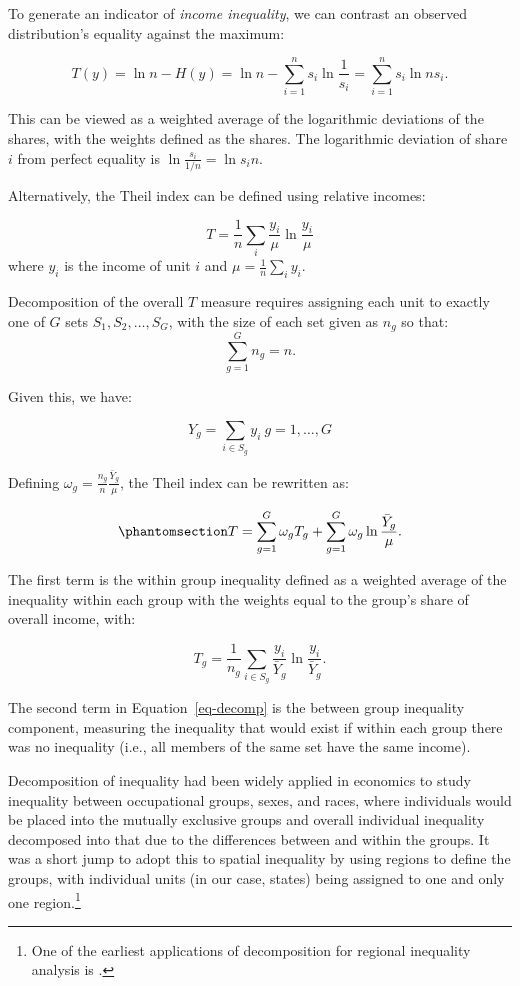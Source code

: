 \documentclass[
  a4paper, 
  twoside,
  final
]{article}
\begin{document}
To generate an indicator of \emph{income inequality}, we can contrast an
observed distribution's equality against the maximum:

\[T(y) = \ln n - H(y) = \ln n - \sum_{i=1}^n s_i \ln \frac{1}{s_i}=\sum_{i=1}^n s_i \ln n s_i.\]

This can be viewed as a weighted average of the logarithmic deviations
of the shares, with the weights defined as the shares. The logarithmic
deviation of share \(i\) from perfect equality is
\(\ln \frac{s_i}{1/n} = \ln s_i n\).

Alternatively, the Theil index can be defined using relative incomes:

\[T = \frac{1}{n} \sum_i \frac{y_i}{\mu} \ln \frac{y_i}{\mu}\] where
\(y_i\) is the income of unit \(i\) and
\(\mu = \frac{1}{n} \sum_i y_i\).

Decomposition of the overall \(T\) measure requires assigning each unit
to exactly one of \(G\) sets \(S_1, S_2, \ldots, S_G\), with the size of
each set given as \(n_g\) so that: \[
\sum_{g=1}^G n_g = n.
\]

Given this, we have:

\[Y_g = \sum_{i \in S_g} y_i \ g=1,\ldots,G\]

Defining \(\omega_g = \frac{n_g}{n} \frac{\bar{Y}_g}{\mu}\), the Theil
index can be rewritten as:

\begin{equation}\phantomsection\label{eq-decomp}{
T = \sum_{g=1}^G \omega_g T_g + \sum_{g=1}^G \omega_g \ln
\frac{\bar{Y}_g}{\mu}.
}\end{equation}

The first term is the within group inequality defined as a weighted
average of the inequality within each group with the weights equal to
the group's share of overall income, with:

\[T_g = \frac{1}{n_g} \sum_{i \in S_g} \frac{y_i}{\bar{Y}_g} \ln \frac{y_i}{\bar{Y}_g}.\]

The second term in Equation~\ref{eq-decomp} is the between group
inequality component, measuring the inequality that would exist if
within each group there was no inequality (i.e., all members of the same
set have the same income).

Decomposition of inequality had been widely applied in economics to
study inequality between occupational groups, sexes, and races, where
individuals would be placed into the mutually exclusive groups and
overall individual inequality decomposed into that due to the
differences between and within the groups. It was a short jump to adopt
this to spatial inequality by using regions to define the groups, with
individual units (in our case, states) being assigned to one and only
one region.\footnote{One of the earliest applications of decomposition
  for regional inequality analysis is
  \citet{theil1967EconomicsInformation}.}
\end{document}
